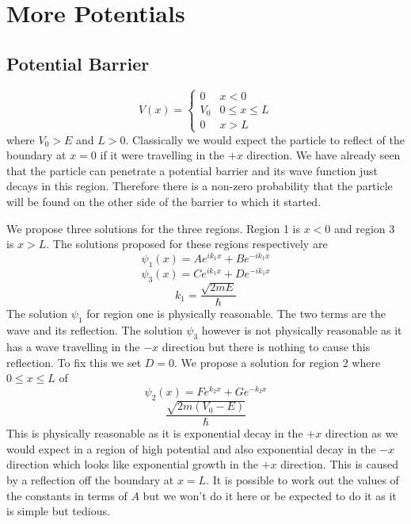 \documentclass{article}
\begin{document}
    \section{More Potentials}
    \subsection{Potential Barrier}
    \[
        V(x) = 
        \begin{cases}
            0 & x < 0\\
            V_0 & 0 \le x \le L\\
            0 & x > L
        \end{cases}
    \]
    where \(V_0 > E\) and \(L > 0\).
    Classically we would expect the particle to reflect of the boundary at \(x = 0\) if it were travelling in the \(+x\) direction.
    We have already seen that the particle can penetrate a potential barrier and its wave function just decays in this region. 
    Therefore there is a non-zero probability that the particle will be found on the other side of the barrier to which it started.
    
    We propose three solutions for the three regions.
    Region 1 is \(x < 0\) and region 3 is \(x > L\).
    The solutions proposed for these regions respectively are
    \[\psi_1(x) = Ae^{ik_1x} + Be^{-ik_1x}\]
    \[\psi_3(x) = Ce^{ik_1x} + De^{-ik_1x}\]
    \[k_1 = \frac{\sqrt{2mE}}{\hbar}\] 
    The solution \(\psi_1\) for region one is physically reasonable.
    The two terms are the wave and its reflection.
    The solution \(\psi_3\) however is not physically reasonable as it has a wave travelling in the \(-x\) direction but there is nothing to cause this reflection.
    To fix this we set \(D = 0\).
    We propose a solution for region 2 where \(0\le x\le L\) of 
    \[\psi_2(x) = Fe^{k_2x} + Ge^{-k_2x}\]
    \[\frac{\sqrt{2m(V_0 - E)}}{\hbar}\]
    This is physically reasonable as it is exponential decay in the \(+x\) direction as we would expect in a region of high potential and also exponential decay in the \(-x\) direction which looks like exponential growth in the \(+x\) direction.
    This is caused by a reflection off the boundary at \(x = L\).
    It is possible to work out the values of the constants in terms of \(A\) but we won't do it here or be expected to do it as it is simple but tedious.
    
\end{document}
